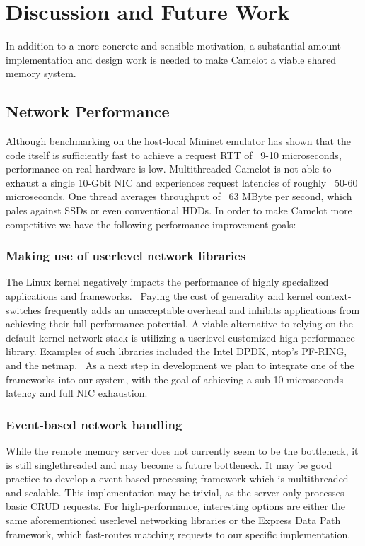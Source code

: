\section{Discussion and Future Work}
In addition to a more concrete and sensible motivation, a substantial amount implementation and design work is needed to make Camelot a viable shared memory system.

\subsection{Network Performance}
Although benchmarking on the host-local Mininet emulator has shown that the code itself is sufficiently fast to achieve a request RTT of ~9-10 microseconds, performance on real hardware is low. Multithreaded Camelot is not able to exhaust a single 10-Gbit NIC and experiences request latencies of roughly ~50-60 microseconds. One thread averages throughput of ~63 MByte per second,  which pales against SSDs or even conventional HDDs.
In order to make Camelot more competitive we have the following performance improvement goals:

\subsubsection{Making use of userlevel network libraries}
The Linux kernel negatively impacts the performance of highly specialized applications and frameworks.~\cite{packet_io} Paying the cost of generality and kernel context-switches frequently adds an unacceptable overhead and inhibits applications from achieving their full performance potential. A viable alternative to relying on the default kernel network-stack is utilizing a userlevel customized high-performance library. Examples of such libraries included the Intel DPDK, ntop's PF-RING, and the netmap.~\cite{packet_io}
As a next step in development we plan to integrate one of the frameworks into our system, with the goal of achieving a sub-10 microseconds latency and full NIC exhaustion.

\subsubsection{Event-based network handling}
While the remote memory server does not currently seem to be the bottleneck, it is still singlethreaded and may become a future bottleneck. It may be good practice to develop a event-based processing framework which is multithreaded and scalable. This implementation may be trivial, as the server only processes basic CRUD requests. For high-performance, interesting options are either the same aforementioned userlevel networking libraries or the Express Data Path~\cite{xdp} framework, which fast-routes matching requests to our specific implementation.


